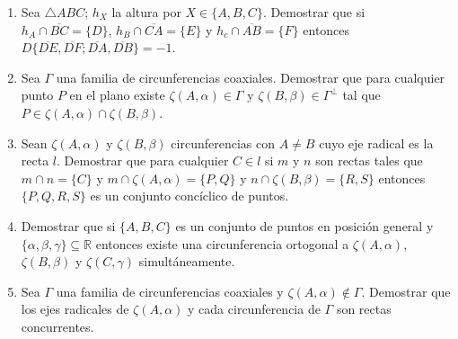 \documentclass[12pt]{report}
\newcommand{\R}{\mathbb R}
\begin{document}
\begin{enumerate}


\item Sea $\triangle ABC$; $h_X$ la altura por $X \in \{A,B,C\}$. Demostrar que si $h_A \cap \overline{BC}=\{D\}$, $h_B \cap \overline{CA}=\{E\}$ y $h_c \cap \overline{AB}=\{F\}$ entonces $D\{\overline{DE},\overline{DF};\overline{DA},\overline{DB}\} = -1$.


\item Sea $\Gamma$ una familia de circunferencias coaxiales. Demostrar que para cualquier punto $P$ en el plano existe $\zeta(A, \alpha) \in \Gamma$ y $\zeta(B,\beta) \in \Gamma^\bot$ tal que $P \in \zeta(A, \alpha) \cap \zeta(B,\beta)$.
 

\item Sean $\zeta(A,\alpha)$ y $\zeta(B,\beta)$ circunferencias con $A \neq B$ cuyo eje radical es la recta $l$. Demostrar que para cualquier $C \in l$ si $m$ y $n$ son rectas tales que $m \cap n = \{C\}$ y $m \cap \zeta(A, \alpha) = \{P,Q\}$ y $n \cap \zeta(B, \beta) = \{R,S\}$ entonces $\{P,Q,R,S\}$ es un conjunto concíclico de puntos.

\item Demostrar que si $\{A,B,C\}$ es un conjunto de puntos en posición general y $\{\alpha, \beta,\gamma\} \subseteq \R$ entonces existe una circunferencia ortogonal a $\zeta(A,\alpha)$, $\zeta(B,\beta)$ y $\zeta(C,\gamma)$ simultáneamente.

\item Sea $\Gamma$ una familia de circunferencias coaxiales y $\zeta(A, \alpha) \notin \Gamma$. Demostrar que los ejes radicales de $\zeta (A, \alpha)$ y cada circunferencia de $\Gamma$ son rectas concurrentes.



\end{enumerate}
\end{document}

